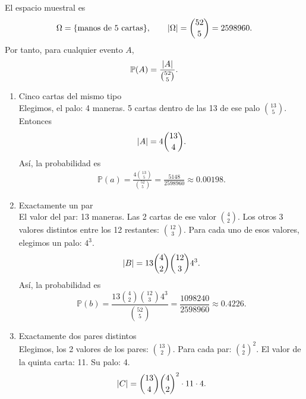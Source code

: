 \message{ !name(tarea2.tex)}\documentclass[12pt,a4paper]{article}
\begin{document}
    \begin{solucion}
        El espacio muestral es
        \begin{align*}
            \Omega=\{\text{manos de 5 cartas}\},\qquad \abs{\Omega}=\binom{52}{5}=2598960.
        \end{align*}
        Por tanto, para cualquier evento $A$,
        \begin{equation*}
            \mathbb{P}(A)=\frac{\abs{A}}{\binom{52}{5}}.
        \end{equation*}
        \begin{enumerate}
            \item[(a)] Cinco cartas del mismo tipo\\
            Elegimos, el palo: 4 maneras. 5 cartas dentro de las 13 de ese palo $\binom{13}{5}$.
            Entonces
            \begin{align*}
                \abs{A}=4\binom{13}{4}.
            \end{align*}
            Así, la probabilidad es
            \begin{align*}
                \mathbb{P}(a)=\frac{4\binom{13}{5}}{\binom{52}{5}}=\frac{5148}{2598960}\approx0.00198.
            \end{align*}
            \item[(b)] Exactamente un par\\
            El valor del par: 13 maneras. Las 2 cartas de ese valor $\binom{4}{2}$. Los otros 3 valores distintos entre los 12 restantes: $\binom{12}{3}$.
            Para cada uno de esos valores, elegimos un palo: $4^{3}$.
            \begin{equation*}
                \abs{B}=13\binom{4}{2}\binom{12}{3}4^{3}.
            \end{equation*}
            Así, la probabilidad es
            \begin{equation*}
                \mathbb{P}(b)=\frac{13\binom{4}{2}\binom{12}{3}4^{3}}{\binom{52}{5}}=\frac{1098240}{2598960}\approx0.4226.
            \end{equation*}
            \item[(c)] Exactamente dos pares distintos\\
            Elegimos, los 2 valores de los pares: $\binom{13}{2}$. Para cada par: $\binom{4}{2}^{2}$.
            El valor de la quinta carta: 11. Su palo: 4.
            \begin{equation*}
                \abs{C}=\binom{13}{4}\binom{4}{2}^{2}\cdot11\cdot4.
            \end{equation*}

\end{enumerate}
\end{solucion}
\end{document}
